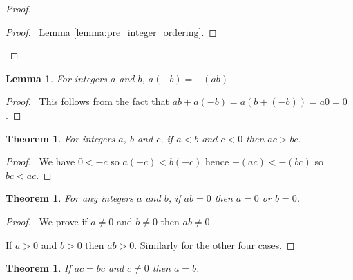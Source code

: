 \documentclass{report}
\let\qed\relax
\newtheorem{lemma}[axiom]{Lemma}
\newtheorem{theorem}[axiom]{Theorem}
\theoremstyle{definition}
\begin{document}
    \begin{proof}
        \pf
        \begin{proof}
            \pf\ Lemma \ref{lemma:pre_integer_ordering}.
        \end{proof}
        \qed
    \end{proof}

    \begin{lemma}
        For integers $a$ and $b$,
        $a(-b) = -(ab)$
    \end{lemma}

    \begin{proof}
        \pf\ This follows from the fact that $ab + a(-b) = a(b + (-b)) = a0 = 0$. \qed
    \end{proof}

    \begin{theorem}
        For integers $a$, $b$ and $c$, if $a < b$ and $c < 0$ then $ac > bc$.
    \end{theorem}

    \begin{proof}
        \pf\ We have $0 < -c$ so $a(-c) < b(-c)$ hence $-(ac) < -(bc)$ so $bc < ac$. \qed
    \end{proof}

    \begin{theorem}
        \label{theorem:integers_no_zero_divisors}
        For any integers $a$ and $b$, if $ab = 0$ then $a = 0$ or $b = 0$.
    \end{theorem}

    \begin{proof}
        \pf\ We prove if $a \neq 0$ and $b \neq 0$ then $ab \neq 0$.
        
        If $a > 0$ and $b > 0$ then $ab > 0$. Similarly for the other four cases. \qed
    \end{proof}

    \begin{theorem}
        \label{theorem:integers_cancel}
        If $ac = bc$ and $c \neq 0$ then $a = b$.
    \end{theorem}
\end{document}
